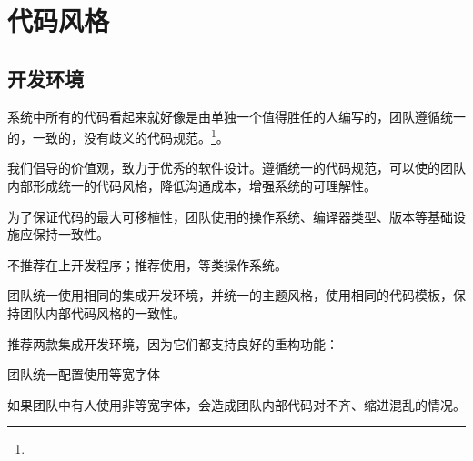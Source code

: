 \begin{savequote}[45mm]
\end{savequote}

\chapter{代码风格} 
\label{ch:physical-design}

\section{开发环境}

\begin{content}

\begin{regulation}
系统中所有的代码看起来就好像是由单独一个值得胜任的人编写的，团队遵循统一的，一致的，没有歧义的代码规范。\footnote{}。
\end{regulation}

我们倡导的价值观，致力于优秀的软件设计。遵循统一的代码规范，可以使的团队内部形成统一的代码风格，降低沟通成本，增强系统的可理解性。

\begin{regulation}
为了保证代码的最大可移植性，团队使用的操作系统、编译器类型、版本等基础设施应保持一致性。
\end{regulation}

不推荐在上开发程序；推荐使用，等类操作系统。

\begin{regulation}
团队统一使用相同的集成开发环境，并统一的主题风格，使用相同的代码模板，保持团队内部代码风格的一致性。
\end{regulation}

推荐两款集成开发环境，因为它们都支持良好的重构功能：
\begin{enum}
\end{enum}

\begin{regulation}
团队统一配置使用等宽字体
\end{regulation}

如果团队中有人使用非等宽字体，会造成团队内部代码对不齐、缩进混乱的情况。


\end{content}
